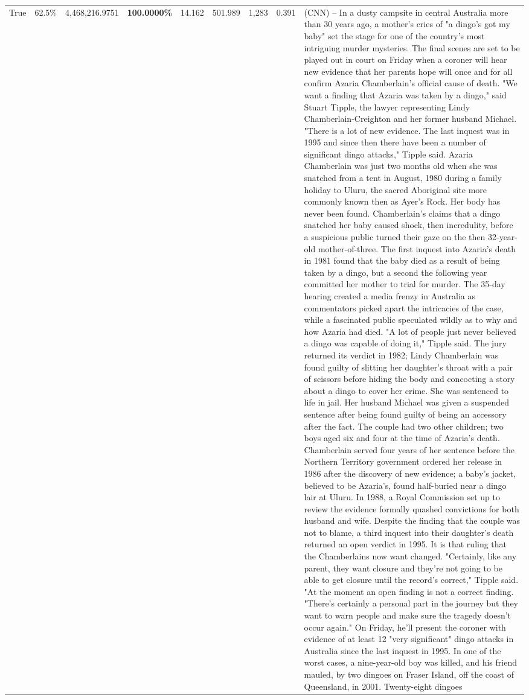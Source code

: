 \begin{table}[H]
\begin{tabular}{lllrlllll}
True & 62.5\% & 4,468,216.9751 & \bfseries \color{red} 100.0000\% & 14.162 & 501.989 & 1,283 & 0.391 & (CNN) -- In a dusty campsite in central Australia more than 30 years ago, a mother's cries of "a dingo's got my baby" set the stage for one of the country's most intriguing murder mysteries. The final scenes are set to be played out in court on Friday when a coroner will hear new evidence that her parents hope will once and for all confirm Azaria Chamberlain's official cause of death. "We want a finding that Azaria was taken by a dingo," said Stuart Tipple, the lawyer representing Lindy Chamberlain-Creighton and her former husband Michael. "There is a lot of new evidence. The last inquest was in 1995 and since then there have been a number of significant dingo attacks," Tipple said. Azaria Chamberlain was just two months old when she was snatched from a tent in August, 1980 during a family holiday to Uluru, the sacred Aboriginal site more commonly known then as Ayer's Rock. Her body has never been found. Chamberlain's claims that a dingo snatched her baby caused shock, then incredulity, before a suspicious public turned their gaze on the then 32-year-old mother-of-three. The first inquest into Azaria's death in 1981 found that the baby died as a result of being taken by a dingo, but a second the following year committed her mother to trial for murder. The 35-day hearing created a media frenzy in Australia as commentators picked apart the intricacies of the case, while a fascinated public speculated wildly as to why and how Azaria had died. "A lot of people just never believed a dingo was capable of doing it," Tipple said. The jury returned its verdict in 1982; Lindy Chamberlain was found guilty of slitting her daughter's throat with a pair of scissors before hiding the body and concocting a story about a dingo to cover her crime. She was sentenced to life in jail. Her husband Michael was given a suspended sentence after being found guilty of being an accessory after the fact. The couple had two other children; two boys aged six and four at the time of Azaria's death. Chamberlain served four years of her sentence before the Northern Territory government ordered her release in 1986 after the discovery of new evidence; a baby's jacket, believed to be Azaria's, found half-buried near a dingo lair at Uluru. In 1988, a Royal Commission set up to review the evidence formally quashed convictions for both husband and wife. Despite the finding that the couple was not to blame, a third inquest into their daughter's death returned an open verdict in 1995. It is that ruling that the Chamberlains now want changed. "Certainly, like any parent, they want closure and they're not going to be able to get closure until the record's correct," Tipple said. "At the moment an open finding is not a correct finding. "There's certainly a personal part in the journey but they want to warn people and make sure the tragedy doesn't occur again." On Friday, he'll present the coroner with evidence of at least 12 "very significant" dingo attacks in Australia since the last inquest in 1995. In one of the worst cases, a nine-year-old boy was killed, and his friend mauled, by two dingoes on Fraser Island, off the coast of Queensland, in 2001. Twenty-eight dingoes 
\end{tabular}
\end{table}
